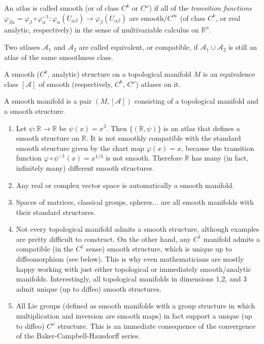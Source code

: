 \documentclass[english,letterpaper]{article}%
\numberwithin{equation}{section}
\numberwithin{figure}{section}
\numberwithin{table}{section}
\theoremstyle{definition}
\theoremstyle{definition}
\theoremstyle{definition}
\theoremstyle{plain}
\theoremstyle{plain}
\theoremstyle{plain}
\theoremstyle{plain}
\theoremstyle{remark}
\theoremstyle{remark}
\begin{document}
\begin{defn}
An atlas is called smooth (or of class $C^k$ or $C^\omega$) if all of the \emph{transition functions} $\varphi_{\beta\alpha}=\varphi_\beta\circ\varphi_\alpha^{-1}:\varphi_\alpha(U_{\alpha\beta})\to\varphi_\beta(U_{\alpha\beta})$ are smooth/$C^\infty$ (of class $C^k$, or real analytic, respectively) in the sense of multivariable calculus on $\mathbb{R}^n$.
\end{defn}
\begin{defn}
Two atlases $\mathcal{A}_1$ and $\mathcal{A}_2$ are called equivalent, or compatible, if $\mathcal{A}_1\cup\mathcal{A}_2$ is still an atlas of the same smoothness class.
\end{defn}
\begin{defn}
A smooth ($C^k$, analytic) structure on a topological manifold $M$ is an equivalence class $[\mathcal{A}]$ of smooth (respectively, $C^k$, $C^\omega$) atlases on it. 
\end{defn}
\begin{defn}
A smooth manifold is a pair $(M,[\mathcal{A}])$ consisting of a topological manifold and a smooth structure.
\end{defn}
\begin{example}
\begin{enumerate}
    \item Let $\psi:\mathbb{R}\to\mathbb{R}$ be $\psi(x)=x^3$. Then $\{(\mathbb{R},\psi)\}$ is an atlas that defines a smooth structure on $\mathbb{R}$. It is not smoothly compatible with the standard smooth structure given by the chart map $\varphi(x)=x$, because the transition function $\varphi\circ \psi^{-1}(x)=x^{1/3}$ is not smooth. Therefore $\mathbb{R}$ has many (in fact, infinitely many) different smooth structures.
    \item Any real or complex vector space is automatically a smooth manifold.
    \item Spaces of matrices, classical groups, spheres... are all smooth manifolds with their standard structures.
    \item Not every topological manifold admits a smooth structure, although examples are pretty difficult to construct. On the other hand, any $C^1$ manifold admits a compatible (in the $C^1$ sense) smooth structure, which is unique up to diffeomorphism (see below). This is why even mathematicians are mostly happy working with just either topological or immediately smooth/analytic manifolds. Interestingly, all topological manifolds in dimensions 1,2, and 3 admit unique (up to diffeo) smooth structures.
    \item All Lie groups (defined as smooth manifolds with a group structure in which multiplication and inversion are smooth maps) in fact support a unique (up to diffeo) $C^\omega$ structure. This is an immediate consequence of the convergence of the Baker-Campbell-Hausdorff series.
\end{enumerate}
\end{example}
\end{document}
